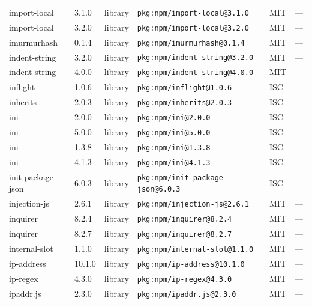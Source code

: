 \documentclass[11pt,a4paper]{article}
\begin{document}
\begin{longtable}{|p{4cm}|p{2cm}|p{1.6cm}|p{5cm}|p{1.5cm}|p{3.5cm}|}
\raggedright import-local & 3.1.0 & library & \small\texttt{pkg:npm/import-local@3.1.0} & MIT & \small — \\
\raggedright import-local & 3.2.0 & library & \small\texttt{pkg:npm/import-local@3.2.0} & MIT & \small — \\
\raggedright imurmurhash & 0.1.4 & library & \small\texttt{pkg:npm/imurmurhash@0.1.4} & MIT & \small — \\
\raggedright indent-string & 3.2.0 & library & \small\texttt{pkg:npm/indent-string@3.2.0} & MIT & \small — \\
\raggedright indent-string & 4.0.0 & library & \small\texttt{pkg:npm/indent-string@4.0.0} & MIT & \small — \\
\raggedright inflight & 1.0.6 & library & \small\texttt{pkg:npm/inflight@1.0.6} & ISC & \small — \\
\raggedright inherits & 2.0.3 & library & \small\texttt{pkg:npm/inherits@2.0.3} & ISC & \small — \\
\raggedright ini & 2.0.0 & library & \small\texttt{pkg:npm/ini@2.0.0} & ISC & \small — \\
\raggedright ini & 5.0.0 & library & \small\texttt{pkg:npm/ini@5.0.0} & ISC & \small — \\
\raggedright ini & 1.3.8 & library & \small\texttt{pkg:npm/ini@1.3.8} & ISC & \small — \\
\raggedright ini & 4.1.3 & library & \small\texttt{pkg:npm/ini@4.1.3} & ISC & \small — \\
\raggedright init-package-json & 6.0.3 & library & \small\texttt{pkg:npm/init-package-json@6.0.3} & ISC & \small — \\
\raggedright injection-js & 2.6.1 & library & \small\texttt{pkg:npm/injection-js@2.6.1} & MIT & \small — \\
\raggedright inquirer & 8.2.4 & library & \small\texttt{pkg:npm/inquirer@8.2.4} & MIT & \small — \\
\raggedright inquirer & 8.2.7 & library & \small\texttt{pkg:npm/inquirer@8.2.7} & MIT & \small — \\
\raggedright internal-slot & 1.1.0 & library & \small\texttt{pkg:npm/internal-slot@1.1.0} & MIT & \small — \\
\raggedright ip-address & 10.1.0 & library & \small\texttt{pkg:npm/ip-address@10.1.0} & MIT & \small — \\
\raggedright ip-regex & 4.3.0 & library & \small\texttt{pkg:npm/ip-regex@4.3.0} & MIT & \small — \\
\raggedright ipaddr.js & 2.3.0 & library & \small\texttt{pkg:npm/ipaddr.js@2.3.0} & MIT & \small — \\

\end{longtable}
\end{document}
